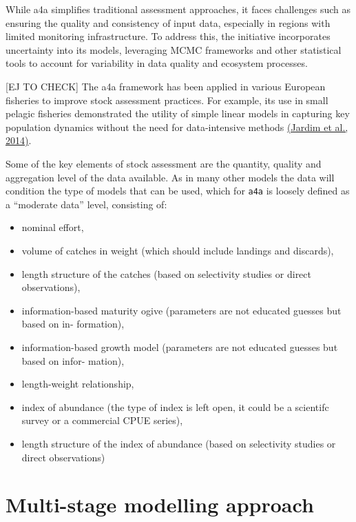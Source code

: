 \documentclass[
]{book}
\providecommand{\tightlist}{%
  \setlength{\itemsep}{0pt}\setlength{\parskip}{0pt}}
\begin{document}
While a4a simplifies traditional assessment approaches, it faces challenges such as ensuring the quality and consistency of input data, especially in regions with limited monitoring infrastructure. To address this, the initiative incorporates uncertainty into its models, leveraging MCMC frameworks and other statistical tools to account for variability in data quality and ecosystem processes.

{[}EJ TO CHECK{]} The a4a framework has been applied in various European fisheries to improve stock assessment practices. For example, its use in small pelagic fisheries demonstrated the utility of simple linear models in capturing key population dynamics without the need for data-intensive methods \href{https://typeset.io/papers/food-for-thought-what-if-stock-assessment-is-as-simple-as-a-22co3slqjr}{(Jardim et al., 2014)}.

Some of the key elements of stock assessment are the quantity, quality and aggregation level of the data available. As in many other models the data will condition the type of models that can be used, which for \texttt{a4a} is loosely defined as a ``moderate data'' level, consisting of:

\begin{itemize}
\tightlist
\item
  nominal effort,
\item
  volume of catches in weight (which should include landings and discards),
\item
  length structure of the catches (based on selectivity studies or direct observations),
\item
  information-based maturity ogive (parameters are not educated guesses but based on in-
  formation),
\item
  information-based growth model (parameters are not educated guesses but based on infor-
  mation),
\item
  length-weight relationship,
\item
  index of abundance (the type of index is left open, it could be a scientifc survey or a
  commercial CPUE series),
\item
  length structure of the index of abundance (based on selectivity studies or direct observations)
\end{itemize}

\hypertarget{multi-stage-modelling-approach}{%
\section{Multi-stage modelling approach}\label{multi-stage-modelling-approach}}
\end{document}
